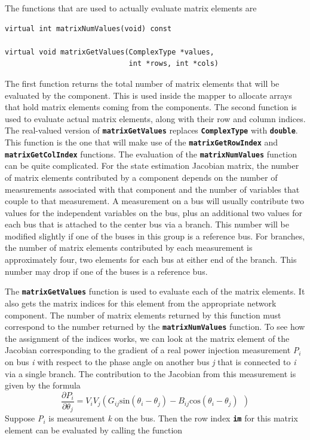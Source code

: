 \documentclass[12pt]{report} %
\begin{document}
The functions that are used to actually evaluate matrix elements are

{
\color{red}
\begin{Verbatim}[fontseries=b]
virtual int matrixNumValues(void) const

virtual void matrixGetValues(ComplexType *values,
                             int *rows, int *cols)
\end{Verbatim}
}

The first function returns the total number of matrix elements that will be evaluated by the component. This is used inside the mapper to allocate arrays that hold matrix elements coming from the components. The second function is used to evaluate actual matrix elements, along with their row and column indices. The real-valued version of \texttt{\textbf{matrixGetValues}} replaces \texttt{\textbf{ComplexType}} with \texttt{\textbf{double}}. This function is the one that will make use of the \texttt{\textbf{matrixGetRowIndex}} and \texttt{\textbf{matrixGetColIndex}} functions. The evaluation of the \texttt{\textbf{matrixNumValues}} function can be quite complicated. For the state estimation Jacobian matrix, the number of matrix elements contributed by a component depends on the number of measurements associated with that component and the number of variables that couple to that measurement. A measurement on a bus will usually contribute two values for the independent variables on the bus, plus an additional two values for each bus that is attached to the center bus via a branch. This number will be modified slightly if one of the buses in this group is a reference bus. For branches, the number of matrix elements contributed by each measurement is approximately four, two elements for each bus at either end of the branch. This number may drop if one of the buses is a reference bus.

The \texttt{\textbf{matrixGetValues}} function is used to evaluate each of the matrix elements. It also gets the matrix indices for this element from the appropriate network component. The number of matrix elements returned by this function must correspond to the number returned by the \texttt{\textbf{matrixNumValues}} function. To see how the assignment of the indices works, we can look at the matrix element of the Jacobian corresponding to the gradient of a real power injection measurement \textit{P${}_{i}$} on bus \textit{i} with respect to the phase angle on another bus \textit{j} that is connected to \textit{i} via a single branch. The contribution to the Jacobian from this measurement is given by the formula\[\frac{\partial P_i}{\partial {\theta }_j}=V_iV_j(G_{ij}{\mathrm{sin} \left({\theta }_i-{\theta }_j\right)-B_{ij}{\mathrm{cos} ({\theta }_i-{\theta }_j)\ }\ })\] 
Suppose \textit{P${}_{i}$} is measurement \textit{k} on the bus. Then the row index \texttt{\textbf{im}} for this matrix element can be evaluated by calling the function
\end{document}
